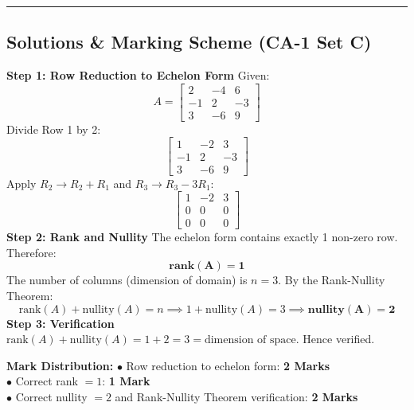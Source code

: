 \vspace{5mm}
\hrule
\vspace{5mm}

\subsection*{Solutions \& Marking Scheme (CA-1 Set C)}

\begin{solutionbox}
\textbf{Step 1: Row Reduction to Echelon Form}
Given:
\[
A = \begin{bmatrix} 2 & -4 & 6 \\ -1 & 2 & -3 \\ 3 & -6 & 9 \end{bmatrix}
\]
Divide Row 1 by 2:
\[
\begin{bmatrix} 1 & -2 & 3 \\ -1 & 2 & -3 \\ 3 & -6 & 9 \end{bmatrix}
\]
Apply $R_2 \to R_2 + R_1$ and $R_3 \to R_3 - 3R_1$:
\[
\begin{bmatrix} 1 & -2 & 3 \\ 0 & 0 & 0 \\ 0 & 0 & 0 \end{bmatrix}
\]
\textbf{Step 2: Rank and Nullity}
The echelon form contains exactly 1 non-zero row. Therefore:
\[
\mathbf{\text{rank}(A) = 1}
\]
The number of columns (dimension of domain) is $n = 3$.
By the Rank-Nullity Theorem:
\[
\text{rank}(A) + \text{nullity}(A) = n \implies 1 + \text{nullity}(A) = 3 \implies \mathbf{\text{nullity}(A) = 2}
\]
\textbf{Step 3: Verification}
$\text{rank}(A) + \text{nullity}(A) = 1 + 2 = 3 = \text{dimension of space}$. Hence verified.

\begin{markingrubric}
\textbf{Mark Distribution:}
$\bullet$ Row reduction to echelon form: \textbf{2 Marks}\\
$\bullet$ Correct rank $= 1$: \textbf{1 Mark}\\
$\bullet$ Correct nullity $= 2$ and Rank-Nullity Theorem verification: \textbf{2 Marks}
\end{markingrubric}
\end{solutionbox}

